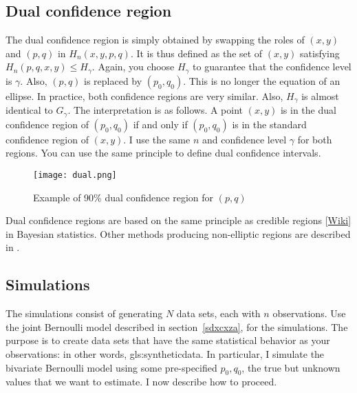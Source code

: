 \documentclass[oneside,10pt]{book}
\begin{document}
\subsection{Dual confidence region}

The \textcolor{index}{dual confidence region} is simply obtained by swapping the roles of $(x, y)$ and $(p, q)$ in $H_n(x, y, p, q)$. It is thus defined as the set of $(x, y)$ satisfying $H_n(p, q, x, y) \leq H_\gamma$. Again, you choose $H_\gamma$ to guarantee that the confidence level is $\gamma$. Also, $(p, q)$ is replaced by $(p_0, q_0)$. This is no longer the equation of an ellipse. In practice, both confidence regions are very similar. Also, $H_\gamma$ is almost identical to $G_\gamma$. The interpretation is as follows. A point $(x, y)$ is in the dual confidence region of $(p_0, q_0)$ if and only if $(p_0, q_0)$ is in the standard confidence region of $(x, y)$. I use the same $n$ and confidence level $\gamma$ for both regions. You can use the same principle to define dual confidence intervals.

\begin{figure}%
\centering
\texttt{[image: dual.png]} %
\caption{Example of 90\% dual confidence region for $(p, q)$}
\label{fig:pbcixccx}
\end{figure}

Dual confidence regions are based on the same principle as \textcolor{index}{credible regions} [\href{https://en.wikipedia.org/wiki/Credible_interval}{Wiki}] in Bayesian statistics. Other methods producing non-elliptic regions are described in \cite{ploshu2013}.


\subsection{Simulations} \label{simulpetes}

The simulations consist of generating $N$ data sets, each with $n$ observations. Use the joint Bernoulli model described in  section~\ref{sdxcxza}, for the simulations. The purpose is to create data sets that have the same statistical behavior as your observations: 
 in other words, \gls{gls:syntheticdata}. In particular, I simulate the bivariate Bernoulli model using some pre-specified $p_0, q_0$, the true but unknown values that we want to estimate.  I now describe how to proceed.
\end{document}
